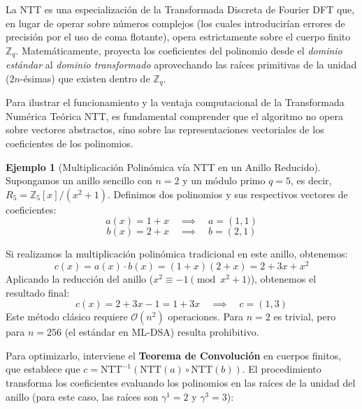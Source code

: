 \documentclass[11pt, a4paper]{report}
\theoremstyle{definition}
\newtheorem{ejemplo}{Ejemplo}[chapter]
\begin{document}
La NTT es una especialización de la Transformada Discreta de Fourier DFT que, en lugar de operar sobre números complejos (los cuales introducirían errores de precisión por el uso de coma flotante), opera estrictamente sobre el cuerpo finito $\mathbb{Z}_q$. Matemáticamente, proyecta los coeficientes del polinomio desde el \textit{dominio estándar} al \textit{dominio transformado} aprovechando las raíces primitivas de la unidad ($2n$-ésimas) que existen dentro de $\mathbb{Z}_q$.

Para ilustrar el funcionamiento y la ventaja computacional de la Transformada Numérica Teórica NTT, es fundamental comprender que el algoritmo no opera sobre vectores abstractos, sino sobre las representaciones vectoriales de los coeficientes de los polinomios.

\begin{ejemplo}[Multiplicación Polinómica vía NTT en un Anillo Reducido]
\label{ex:ntt_juguete}
Supongamos un anillo sencillo con $n=2$ y un módulo primo $q=5$, es decir, $R_5 = \mathbb{Z}_5[x]/(x^2 + 1)$. Definimos dos polinomios y sus respectivos vectores de coeficientes:
\[a(x) = 1 + x \quad \implies \quad a = (1, 1)\]
\[b(x) = 2 + x \quad \implies \quad b = (2, 1)\]

Si realizamos la multiplicación polinómica tradicional en este anillo, obtenemos:
\[c(x) = a(x) \cdot b(x) = (1+x)(2+x) = 2 + 3x + x^2\]
Aplicando la reducción del anillo ($x^2 \equiv -1 \pmod{x^2 + 1}$), obtenemos el resultado final:
\[c(x) = 2 + 3x - 1 = 1 + 3x \quad \implies \quad c = (1, 3)\]
Este método clásico requiere $\mathcal{O}(n^2)$ operaciones. Para $n=2$ es trivial, pero para $n=256$ (el estándar en ML-DSA) resulta prohibitivo.

Para optimizarlo, interviene el \textbf{Teorema de Convolución} en cuerpos finitos, que establece que $c = \text{NTT}^{-1}(\text{NTT}(a) \circ \text{NTT}(b))$. El procedimiento transforma los coeficientes evaluando los polinomios en las raíces de la unidad del anillo (para este caso, las raíces son $\gamma^1 = 2$ y $\gamma^3 = 3$):


\end{ejemplo}
\end{document}

